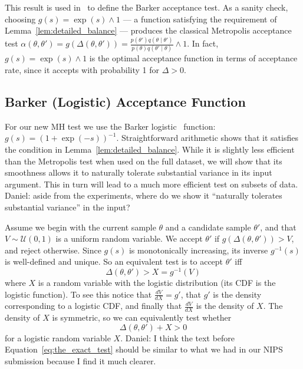 \documentclass{article}
\begin{document}
This result is used in~\cite{Barker65} to define the Barker acceptance test.  As
a sanity check, choosing $g(s) = \exp(s) \wedge 1$ --- a function satisfying the
requirement of Lemma~\ref{lem:detailed_balance} --- produces the classical
Metropolis acceptance test $\alpha(\theta,\theta') = g(\Delta(\theta,\theta')) =
\frac{p(\theta')q(\theta \mid \theta')}{p(\theta)q(\theta' \mid \theta)}\wedge
1$. In fact, $g(s) =\exp(s) \wedge 1$ is the optimal acceptance function in
terms of acceptance rate, since it accepts with probability 1 for $\Delta > 0$.

\subsection{Barker (Logistic) Acceptance Function}\label{ssec:barker_function}
For our new MH test we use the Barker logistic~\cite{Barker65} function:
$g(s)=(1+\exp(-s))^{-1}$. Straightforward arithmetic shows that it satisfies the
condition in Lemma~\ref{lem:detailed_balance}.  While it is slightly less
efficient than the Metropolis test when used on the full dataset, we will show
that its smoothness allows it to naturally tolerate substantial variance in its
input argument. This in turn will lead to a much more efficient test on subsets
of data. {\color{blue} Daniel: aside from the experiments, where do we show it
``naturally tolerates substantial variance'' in the input?} 

Assume we begin with the current sample $\theta$ and a candidate sample
$\theta'$, and that $V \sim \mathcal{U}(0,1)$ is a uniform random variable. We
accept $\theta'$ if $g(\Delta(\theta,\theta')) > V$, and reject otherwise.
Since $g(s)$ is monotonically increasing, its inverse $g^{-1}(s)$ is
well-defined and unique. So an equivalent test is to accept $\theta'$ iff
\begin{equation}\label{eq:equivalent_test}
    \Delta(\theta,\theta') > X = g^{-1}(V)
\end{equation}
where $X$ is a random variable with the logistic distribution (its CDF is the
logistic function). To see this notice that $\frac{dV}{dX} = g'$, that $g'$ is
the density corresponding to a logistic CDF, and finally that $\frac{dV}{dX}$ is
the density of $X$. The density of $X$ is symmetric, so we can equivalently test
whether
\begin{equation}\label{eq:the_exact_test}
    \Delta(\theta,\theta') + X > 0
\end{equation}
for a logistic random variable $X$. {\color{blue} Daniel: I think the text
before Equation~\ref{eq:the_exact_test} should be similar to what we had in our
NIPS submission because I find it much clearer.}
\end{document}
